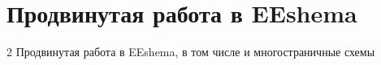 \chapter{Продвинутая работа в EEshema}\label{kicad:eeschema-adv}
2 Продвинутая работа в EEshema, в том числе и многостраничные схемы
